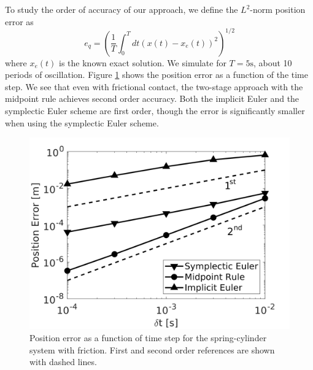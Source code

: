 To study the order of accuracy of our approach, we define the $L^2$-norm
position error as
\begin{equation*}
    e_q = \left(\frac{1}{T}\int_0^T dt(x(t)-x_e(t))^2\right)^{1/2}
\end{equation*}
where $x_e(t)$ is the known exact solution. We simulate for $T=5\text{s}$, about
10 periods of oscillation. Figure \ref{fig:spring_cylinder_position_error} shows
the position error as a function of the time step. We see that even with
frictional contact, the two-stage approach with the midpoint rule achieves
second order accuracy. Both the implicit Euler and the symplectic Euler
scheme are first order, though the error is significantly smaller when using
the symplectic Euler scheme.
\begin{figure}[!h]
	\centering
	\includegraphics[width=0.7\columnwidth]{figures/spring_cylinder/position_error.png}
	\caption{\label{fig:spring_cylinder_position_error} 
	Position error as a function of time step for the spring-cylinder system
	with friction. First and second order references are shown with dashed
	lines.}
\end{figure}
